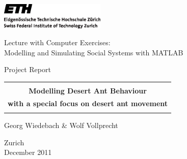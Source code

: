 
\thispagestyle{empty}

\begin{center}
\includegraphics[width=5cm]{images/ETHlogo.eps}

\bigskip


\bigskip


\bigskip


\LARGE{ Lecture with Computer Exercises:\\ }
\LARGE{ Modelling and Simulating Social Systems with MATLAB\\}

\bigskip

\bigskip

\small{Project Report}\\

\bigskip

\bigskip

\bigskip

\bigskip


\begin{tabular}{|c|}
\hline
\\
\textbf{\LARGE{ Modelling Desert Ant Behaviour }}\\
\textbf{\LARGE{ with a special focus on desert ant movement }}\\
\\
\hline
\end{tabular}
\bigskip

\bigskip

\bigskip

\LARGE{Georg Wiedebach \& Wolf Vollprecht}



\bigskip

\bigskip

\bigskip

\bigskip

\bigskip

\bigskip

\bigskip

\bigskip

Zurich\\
December 2011\\

\end{center}


